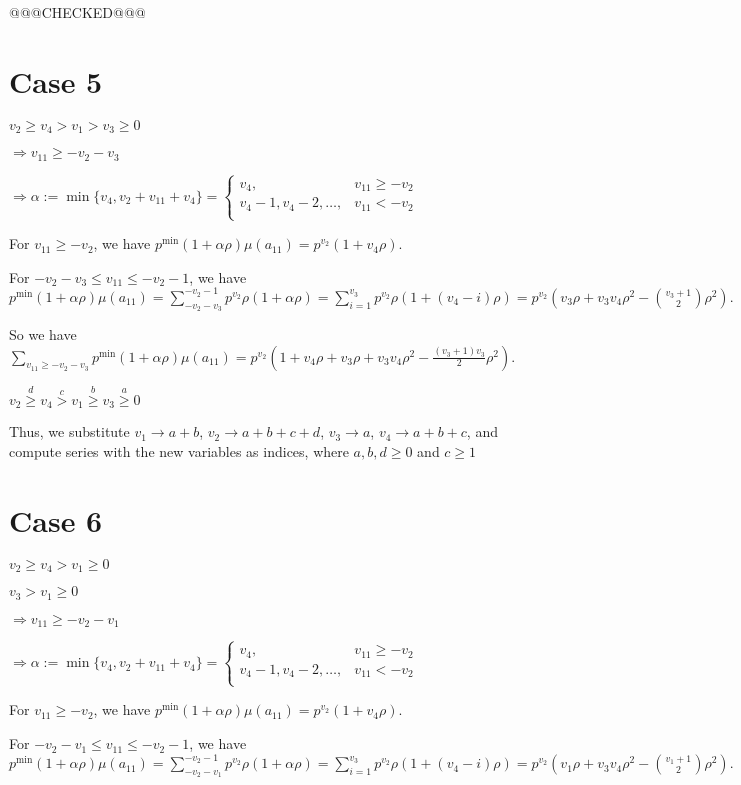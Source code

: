 \documentclass{article}
\begin{document}
@@@CHECKED@@@
\section{Case 5}
$v_2\geq{v_4}>v_1>v_3\geq{0}$

$\Rightarrow{v_{11}}\geq{-v_2-v_3}$

$\Rightarrow\alpha:=\min\{v_4,v_2+v_{11}+v_4\}=\begin{cases}
       v_4, & v_{11}\geq{-v_2}\\
       v_4-1,v_4-2,\dots, & v_{11}<{-v_2}\\
     \end{cases}$

For $v_{11}\geq{-v_2}$, we have $p^{\min}(1+\alpha\rho)\mu(a_{11})=p^{v_2}(1+v_4\rho).$

For $-v_2-v_3\leq{v_{11}}\leq{-v_2-1}$, we have $p^{\min}(1+\alpha\rho)\mu(a_{11})=\sum_{-v_2-v_3}^{-v_2-1}p^{v_2}\rho(1+\alpha\rho)=\sum_{i=1}^{v_3}p^{v_2}\rho(1+(v_4-i)\rho)=p^{v_2}(v_3\rho+v_3v_4\rho^2-\binom{v_3+1}{2}\rho^2).$

So we have $\sum_{v_{11}\geq{-v_2-v_3}}p^{\min}(1+\alpha\rho)\mu(a_{11})=p^{v_2}(1+v_4\rho+v_3\rho+v_3v_4\rho^2-\frac{(v_3+1)v_3}{2}\rho^2).$

$v_2\overset{d}{\geq}v_4\overset{c}{>}v_1\overset{b}{\geq}{v_3}\overset{a}{\geq}{0}$

Thus, we substitute $v_1\rightarrow{a+b}$, $v_2\rightarrow{a+b+c+d}$, $v_3\rightarrow{a}$, $v_4\rightarrow{a+b+c}$, and compute series with the new variables as indices, where $a,b,d\geq{0}$ and $c\geq{1}$
\section{Case 6}
$v_2\geq{v_4}>v_1\geq{0}$

$v_3>v_1\geq{0}$

$\Rightarrow{v_{11}}\geq{-v_2-v_1}$

$\Rightarrow\alpha:=\min\{v_4,v_2+v_{11}+v_4\}=\begin{cases}
       v_4, & v_{11}\geq{-v_2}\\
       v_4-1,v_4-2,\dots, & v_{11}<{-v_2}\\
     \end{cases}$

For $v_{11}\geq{-v_2}$, we have $p^{\min}(1+\alpha\rho)\mu(a_{11})=p^{v_2}(1+v_4\rho).$

For $-v_2-v_1\leq{v_{11}}\leq{-v_2-1}$, we have $p^{\min}(1+\alpha\rho)\mu(a_{11})=\sum_{-v_2-v_1}^{-v_2-1}p^{v_2}\rho(1+\alpha\rho)=\sum_{i=1}^{v_3}p^{v_2}\rho(1+(v_4-i)\rho)=p^{v_2}(v_1\rho+v_3v_4\rho^2-\binom{v_1+1}{2}\rho^2).$
\end{document}
